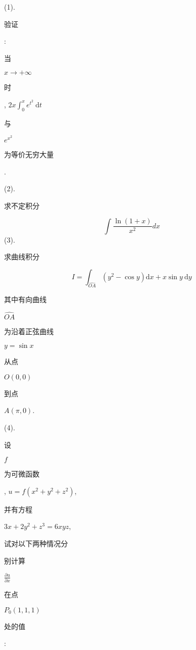 \documentclass[10pt]{article}
\begin{document}
(1). \begin{CJK}{UTF8}{mj}验证\end{CJK}: \begin{CJK}{UTF8}{mj}当\end{CJK} $x \rightarrow+\infty$ \begin{CJK}{UTF8}{mj}时\end{CJK}, $2 x \int_{0}^{x} e^{t^{2}} \mathrm{~d} t$ \begin{CJK}{UTF8}{mj}与\end{CJK} $e^{x^{2}}$ \begin{CJK}{UTF8}{mj}为等价无穷大量\end{CJK}.

(2). \begin{CJK}{UTF8}{mj}求不定积分\end{CJK}
$$
\int \frac{\ln (1+x)}{x^{2}} d x
$$
(3). \begin{CJK}{UTF8}{mj}求曲线积分\end{CJK}
$$
I=\int_{\widehat{O A}}\left(y^{2}-\cos y\right) \mathrm{d} x+x \sin y \mathrm{~d} y
$$
\begin{CJK}{UTF8}{mj}其中有向曲线\end{CJK} $\widehat{O A}$ \begin{CJK}{UTF8}{mj}为沿着正弦曲线\end{CJK} $y=\sin x$ \begin{CJK}{UTF8}{mj}从点\end{CJK} $O(0,0)$ \begin{CJK}{UTF8}{mj}到点\end{CJK} $A(\pi, 0)$.

(4). \begin{CJK}{UTF8}{mj}设\end{CJK} $f$ \begin{CJK}{UTF8}{mj}为可微函数\end{CJK}, $u=f\left(x^{2}+y^{2}+z^{2}\right)$, \begin{CJK}{UTF8}{mj}并有方程\end{CJK} $3 x+2 y^{2}+z^{3}=6 x y z$, \begin{CJK}{UTF8}{mj}试对以下两种情况分\end{CJK} \begin{CJK}{UTF8}{mj}别计算\end{CJK} $\frac{\partial u}{\partial x}$ \begin{CJK}{UTF8}{mj}在点\end{CJK} $P_{0}(1,1,1)$ \begin{CJK}{UTF8}{mj}处的值\end{CJK}:
\end{document}
